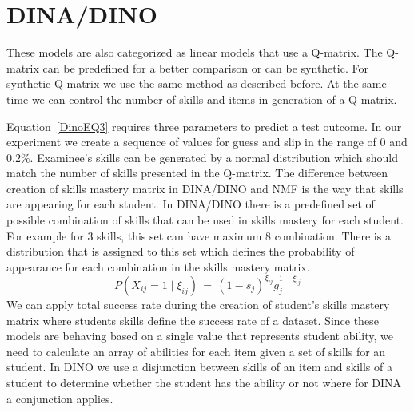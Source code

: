 








\section{DINA/DINO}

These models are also categorized as linear models that use a Q-matrix. The Q-matrix can be predefined for a better comparison or can be synthetic. For synthetic Q-matrix we use the same method as described before. At the same time we can control the number of skills and items in generation of a Q-matrix.

Equation~\ref{DinoEQ3} requires three parameters to predict a test outcome. In our experiment we create a sequence of values for guess and slip in the range of $0$ and $0.2\%$. Examinee's skills can be generated by a normal distribution which should match the number of skills presented in the Q-matrix. The difference between creation of skills mastery matrix in DINA/DINO and NMF is the way that skills are appearing for each student. In DINA/DINO there is a predefined set of possible combination of skills that can be used in skills mastery for each student. For example for 3 skills, this set can have maximum 8 combination. There is a distribution that is assigned to this set which defines the probability of appearance for each combination in the skills mastery matrix. 
\begin{equation}
 P(X_{ij} \!=\! 1 \; | \; \xi_{ij}) \,=\, (1-s_j)^{\xi_{ij}} g_j^{1-\xi_{ij}}
\label{DinoEQ3}
\end{equation}
We can apply total success rate during the creation of student's skills mastery matrix where students skills define the success rate of a dataset. Since these models are behaving based on a single value that represents student ability, we need to calculate an array of abilities for each item given a set of skills for an student. In DINO we use a disjunction between skills of an item and skills of a student to determine whether the student has the ability or not where for DINA a conjunction applies.

